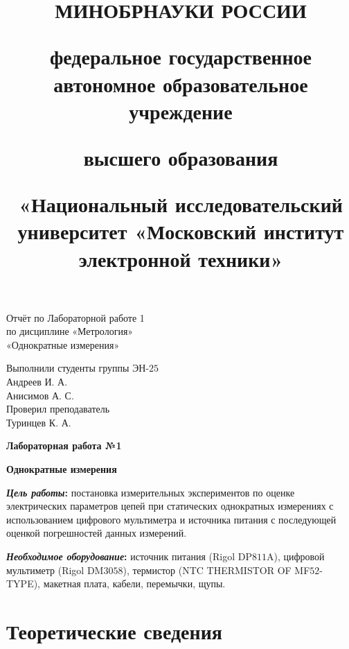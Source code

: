 \documentclass[12pt,a4paper]{article}
\title{
	МИНОБРНАУКИ РОССИИ

	федеральное государственное автономное образовательное учреждение

	высшего образования

	«Национальный исследовательский университет
	«Московский институт электронной техники»
	\vspace{2em}
}
\author{
}
\date{}
\begin{document}
\maketitle
\thispagestyle{fancy}

\begin{center}
\Large Отчёт по Лабораторной работе 1\\
по дисциплине «Метрология»\\
«Однократные измерения»
\end{center}

\vspace{12em}

\begin{flushright}
	Выполнили студенты группы ЭН-$25$\\
	Андреев И. А.\\
	Анисимов А. С.\\
	Проверил преподаватель\\
	Туринцев К. А.
\end{flushright}


\pagebreak

\fancyfoot[C]{\thepage}

\renewcommand{\contentsname}{Оглавление}
\tableofcontents

\pagebreak


\begin{center}
	\Large{\textbf{Лабораторная работа №1}}
\end{center}

\begin{center}
	\LARGE{\textbf{Однократные измерения}}
\end{center}

\large{\textbf{\textit{Цель работы}:} постановка измерительных экспериментов по оценке электрических параметров 
цепей при статических однократных измерениях с использованием цифрового мультиметра 
и источника питания с последующей оценкой погрешностей данных измерений.

\textbf{\textit{Необходимое оборудование}:} источник питания (Rigol DP$811$A), цифровой мультиметр (Rigol DM$3058$), термистор (NTC THERMISTOR OF MF$52$-TYPE), макетная плата, 
кабели, перемычки, щупы.}

\section{Теоретические сведения}
\end{document}
